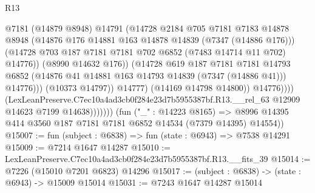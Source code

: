 \begin{lexlean}{R13}
\begin{coremodule}
                                      @7181
                                      (@14879 @8948)
                                      @14791
                                      (@14728
                                        @2184
                                        @705
                                        @7181
                                        @7183
                                        @14878
                                        @8948
                                        (@14876
                                          @176
                                          @14881
                                          @163
                                          @14878
                                          @14839
                                          (@7347 (@14886 @176)))
                                        (@14728
                                          @703
                                          @187
                                          @7181
                                          @7181
                                          @702
                                          @6852
                                          (@7483 @14714 @11 @702)
                                          @14776))
                                      (@8990 @14632 @176))
                                    (@14728
                                      @619
                                      @187
                                      @7181
                                      @7181
                                      @14793
                                      @6852
                                      (@14876 @41 @14881 @163 @14793 @14839 (@7347 (@14886 @41)))
                                      @14776)))
                                (@10373 @14797))
                              @14777)
                            (@14169 @14798 @14800))
                          @14776))))
                  (LexLeanPreserve.C7ec10a4ad3cb0f284e23d7b5955387bf.R13.__rel_63
                    @12909
                    @14623
                    @7199
                    @14638)))))))
      (fun ("_" : @14223 @8165) =>
      @8996 @14395 @414 @3560 @187 @7181 @7181 @6852 @14534 (@7379 @14395) @14554))
@15007 := fun (subject : @6838) => fun (state : @6943) => @7538 @14291
@15009 := @7214 @1647 @14287
@15010 := LexLeanPreserve.C7ec10a4ad3cb0f284e23d7b5955387bf.R13.__fits_39
@15014 := @7226 (@15010 @7201 @6823) @14296
@15017 := (subject : @6838) -> (state : @6943) -> @15009 @15014
@15031 := @7243
    @1647
    @14287
    @15014

\end{coremodule}
\end{lexlean}
